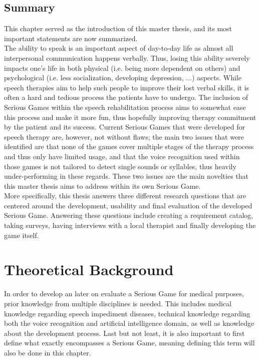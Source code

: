 \documentclass[draft,final]{vutinfth} %
\begin{document}
\section{Summary}
This chapter served as the introduction of this master thesis, and its most important statements are now summarized. \\
The ability to speak is an important aspect of day-to-day life as almost all interpersonal communication happens verbally. Thus, losing this ability severely impacts one's life in both physical (i.e. being more dependent on others) and psychological (i.e. less  socialization, developing depression, ...) aspects. While speech therapies aim to help such people to improve their lost verbal skills, it is often a hard and tedious process the patients have to undergo. The inclusion of Serious Games within the speech rehabilitation process aims to somewhat ease this process and make it more fun, thus hopefully improving therapy commitment by the patient and its success. Current Serious Games that were developed for speech therapy are, however, not without flaws; the main two issues that were identified are that none of the games cover multiple stages of the therapy process and thus only have limited usage, and that the voice recognition used within those games is not tailored to detect single sounds or syllables, thus heavily under-performing in these regards. These two issues are the main novelties that this master thesis aims to address within its own Serious Game. \\
More specifically, this thesis answers three different research questions that are centered around the development, usability and final evaluation of the developed Serious Game. Answering these questions include creating a requirement catalog, taking surveys, having interviews with a local therapist and finally developing the game itself.
\\

\chapter{Theoretical Background}
\label{chap:theory}
In order to develop an later on evaluate a Serious Game for medical purposes, prior knowledge from multiple disciplines is needed. This includes medical knowledge regarding speech impediment diseases, technical knowledge regarding both the voice recognition and artificial intelligence domain, as well as knowledge about the development process. Last but not least, it is also important to first define what exactly encompasses a Serious Game, meaning defining this term will also be done in this chapter.
\end{document}
